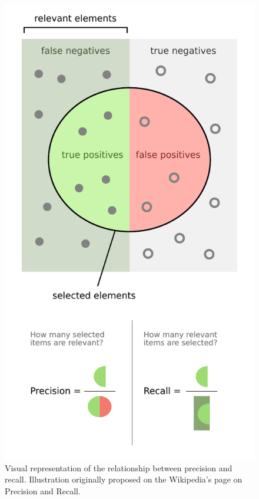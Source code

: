 \begin{figure}[htb]
    \centering
    \includegraphics[height=0.5\textheight]{figures/chap-4/precision-recall.pdf}
    \caption{Visual representation of the relationship between precision and recall. Illustration originally proposed on the Wikipedia's page on Precision and Recall.}
    \label{processing:precision-recall}
\end{figure}

